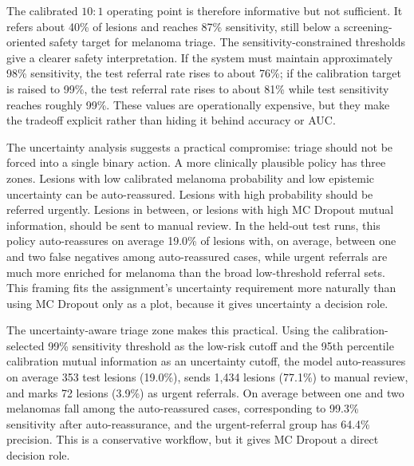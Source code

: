 \documentclass[11pt,a4paper]{article}
\begin{document}
The calibrated $10:1$ operating point is therefore informative but not sufficient. It refers about 40\% of lesions and reaches 87\% sensitivity, still below a screening-oriented safety target for melanoma triage. The sensitivity-constrained thresholds give a clearer safety interpretation. If the system must maintain approximately 98\% sensitivity, the test referral rate rises to about 76\%; if the calibration target is raised to 99\%, the test referral rate rises to about 81\% while test sensitivity reaches roughly 99\%. These values are operationally expensive, but they make the tradeoff explicit rather than hiding it behind accuracy or AUC.

The uncertainty analysis suggests a practical compromise: triage should not be forced into a single binary action. A more clinically plausible policy has three zones. Lesions with low calibrated melanoma probability and low epistemic uncertainty can be auto-reassured. Lesions with high probability should be referred urgently. Lesions in between, or lesions with high MC Dropout mutual information, should be sent to manual review. In the held-out test runs, this policy auto-reassures on average 19.0\% of lesions with, on average, between one and two false negatives among auto-reassured cases, while urgent referrals are much more enriched for melanoma than the broad low-threshold referral sets. This framing fits the assignment's uncertainty requirement more naturally than using MC Dropout only as a plot, because it gives uncertainty a decision role.

The uncertainty-aware triage zone makes this practical. Using the calibration-selected 99\% sensitivity threshold as the low-risk cutoff and the 95th percentile calibration mutual information as an uncertainty cutoff, the model auto-reassures on average 353 test lesions (19.0\%), sends 1,434 lesions (77.1\%) to manual review, and marks 72 lesions (3.9\%) as urgent referrals. On average between one and two melanomas fall among the auto-reassured cases, corresponding to 99.3\% sensitivity after auto-reassurance, and the urgent-referral group has 64.4\% precision. This is a conservative workflow, but it gives MC Dropout a direct decision role.
\end{document}
